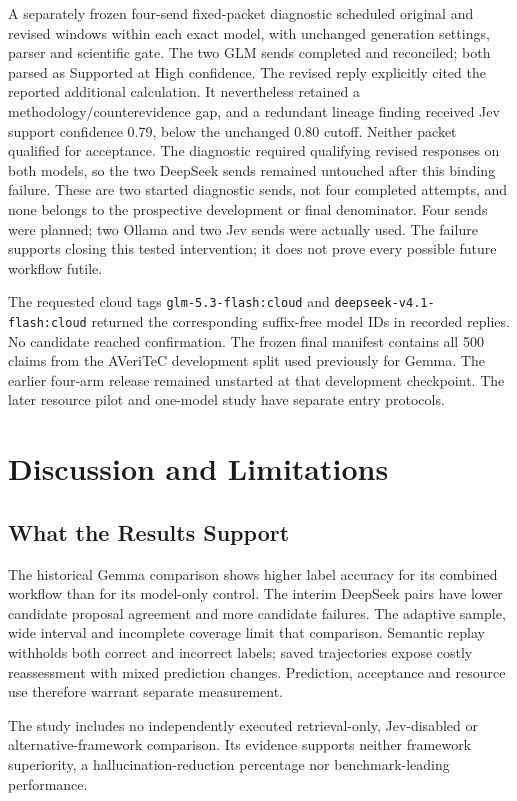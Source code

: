 \documentclass[conference]{IEEEtran}
\begin{document}
A separately frozen four-send fixed-packet diagnostic scheduled original and revised windows within each exact model, with unchanged generation settings, parser and scientific gate. The two GLM sends completed and reconciled; both parsed as Supported at High confidence. The revised reply explicitly cited the reported additional calculation. It nevertheless retained a methodology/counterevidence gap, and a redundant lineage finding received Jev support confidence 0.79, below the unchanged 0.80 cutoff. Neither packet qualified for acceptance. The diagnostic required qualifying revised responses on both models, so the two DeepSeek sends remained untouched after this binding failure. These are two started diagnostic sends, not four completed attempts, and none belongs to the prospective development or final denominator. Four sends were planned; two Ollama and two Jev sends were actually used. The failure supports closing this tested intervention; it does not prove every possible future workflow futile.

The requested cloud tags \texttt{glm-5.3-flash:cloud} and \texttt{deepseek-v4.1-flash:cloud} returned the corresponding suffix-free model IDs in recorded replies. No candidate reached confirmation. The frozen final manifest contains all 500 claims from the AVeriTeC development split used previously for Gemma. The earlier four-arm release remained unstarted at that development checkpoint. The later resource pilot and one-model study have separate entry protocols.

\section{Discussion and Limitations}
\subsection{What the Results Support}
The historical Gemma comparison shows higher label accuracy for its combined workflow than for its model-only control. The interim DeepSeek pairs have lower candidate proposal agreement and more candidate failures. The adaptive sample, wide interval and incomplete coverage limit that comparison. Semantic replay withholds both correct and incorrect labels; saved trajectories expose costly reassessment with mixed prediction changes. Prediction, acceptance and resource use therefore warrant separate measurement.

The study includes no independently executed retrieval-only, Jev-disabled or alternative-framework comparison. Its evidence supports neither framework superiority, a hallucination-reduction percentage nor benchmark-leading performance.
\end{document}
